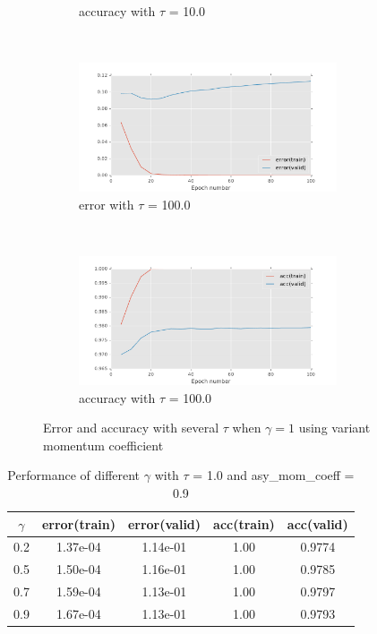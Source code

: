 \documentclass[11pt]{article}
\begin{document}
\begin{figure}[t!]
\begin{subfigure}[t]{0.45\textwidth}
        \caption{accuracy with $\tau$ = 10.0}
    \end{subfigure}   
    ~
    \begin{subfigure}[t]{0.45\textwidth}
        \centering
        \includegraphics[height=1.5in]{error_with_tau_100_0.pdf}
        \caption{error with $\tau$ = 100.0}
    \end{subfigure}   
    ~
    \begin{subfigure}[t]{0.45\textwidth}
        \centering
        \includegraphics[height=1.5in]{acc_with_tau_100_0.pdf}
        \caption{accuracy with $\tau$ = 100.0}
    \end{subfigure}   
    \caption{Error and accuracy with several $\tau$ when $\gamma = 1$ using variant momentum coefficient}    
    \label{fig:tau}
\end{figure}

\begin{table}
\begin{center}
\begin{tabular}{ c c c c c} 
\hline
$\gamma$ & error(train) & error(valid) & acc(train) & acc(valid)\\
\hline
\hline
0.2 & 1.37e-04 & 1.14e-01 & 1.00 & 0.9774 \\ 
0.5 & 1.50e-04 & 1.16e-01 & 1.00 & 0.9785 \\ 
0.7 & 1.59e-04 & 1.13e-01 & 1.00 & 0.9797 \\ 
0.9  &  1.67e-04 & 1.13e-01 & 1.00 & 0.9793 \\
\end{tabular}
\caption{Performance of different $\gamma$ with $\tau$ = 1.0 and asy\_mom\_coeff = 0.9}
\label{tb:tau}
\end{center}	
\end{table}
\end{document}
